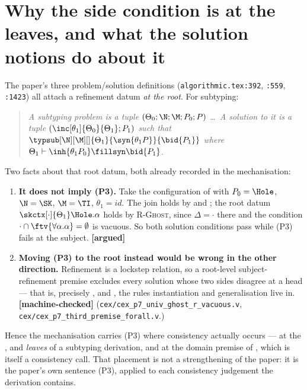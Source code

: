 \documentclass[11pt,a4paper]{article}
\theoremstyle{definition}
\newcommand{\coq}[1]{\texttt{\small #1}}
\newcommand{\MC}{\textbf{[machine-checked]}\xspace}
\newcommand{\ARG}{\textbf{[argued]}\xspace}
\newcommand{\Pcex}{\forall\alpha.\alpha}
\begin{document}
\section{Why the side condition is at the leaves, and what the solution
  notions do about it}\label{sec:solutions}

The paper's three problem/solution definitions
(\coq{algorithmic.tex:392}, \coq{:559}, \coq{:1423}) all attach a
refinement datum \emph{at the root}.  For subtyping:

\begin{quote}\itshape
  A subtyping problem is a tuple $(\Theta_0;\N;\M;P_0;P)$ \dots\ A
  solution to it is a tuple $(\inc[\theta_1]{\Theta_0}{\Theta_1};P_1)$
  such that $\typsub[\N][\M][]{\Theta_1}{\syn{\theta_1 P}}{\bid{P_1}}$
  where $\Theta_1 \vdash \inh{\theta_1 P_0}\fillsyn\bid{P_1}$.
\end{quote}

\noindent
Two facts about that root datum, both already recorded in the
mechanisation:

\begin{enumerate}[leftmargin=*]
\item \textbf{It does not imply (P3).}  Take the configuration of
   with $P_0 = \Hole$, $\N=\SK$, $\M=\TI$, $\theta_1 =
  \mathit{id}$.  The join holds by  and
  ; the root datum
  $\skctx[\cdot]{\Theta_1}\Hole\fill\Pcex$ holds by \textsc{R-Ghost},
  since $\Delta = \cdot$ there and the condition
  $\cdot\cap\ftv{\Pcex}=\emptyset$ is vacuous.  So both solution
  conditions pass while (P3) fails at the subject.  \ARG

\item \textbf{Moving (P3) to the root instead would be wrong in the other
  direction.}  Refinement is a lockstep relation, so a root-level
  subject-refinement premise excludes every solution whose two sides
  disagree at a head --- that is, precisely ,
   and , the rules instantiation and
  generalisation live in.  \MC
  (\coq{cex/cex\_p7\_univ\_ghost\_r\_vacuous.v},
  \coq{cex/cex\_p7\_third\_premise\_forall.v}.)
\end{enumerate}

\noindent
Hence the mechanisation carries (P3) where consistency actually
occurs --- at the ,  and
 \emph{leaves} of a subtyping derivation, and at the
domain premise of , which is itself a consistency call.
That placement is not a strengthening of the paper: it is the paper's own
sentence (P3), applied to each consistency judgement the derivation
contains.
\end{document}
